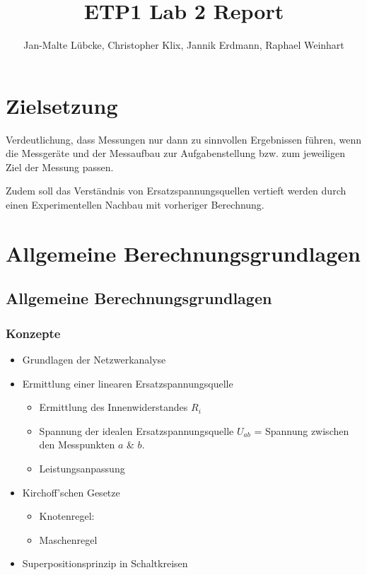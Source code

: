 \documentclass[a4paper, 11pt]{report}
\title{ETP1 Lab 2 Report}
\author{Jan-Malte Lübcke, Christopher Klix, Jannik Erdmann, Raphael Weinhart}
\begin{document}
\maketitle
\tableofcontents
\listoffigures
\listoftables

\part{Zielsetzung}

Verdeutlichung, dass Messungen nur dann zu sinnvollen Ergebnissen führen, wenn die Messgeräte und der Messaufbau zur Aufgabenstellung bzw. zum jeweiligen Ziel der Messung passen.

Zudem soll das Verständnis von Ersatzspannungsquellen vertieft werden durch einen Experimentellen Nachbau mit vorheriger Berechnung.

\part{Allgemeine Berechnungsgrundlagen}

\chapter*{Allgemeine Berechnungsgrundlagen}

\section*{Konzepte}

\begin{itemize}
  \item Grundlagen der Netzwerkanalyse
  \item Ermittlung einer linearen Ersatzspannungsquelle
  \begin{itemize}
    \item Ermittlung des Innenwiderstandes \(R_i\)
    \item Spannung der idealen Ersatzspannungsquelle \(U_{ab}\) = Spannung zwischen den Messpunkten \(a\) \& \(b\).
    \item Leistungsanpassung
  \end{itemize}
  \item Kirchoff’schen Gesetze
  \begin{itemize}
    \item Knotenregel:
    \item Maschenregel
  \end{itemize}
  \item Superpositionsprinzip in Schaltkreisen
\end{itemize}
\end{document}
